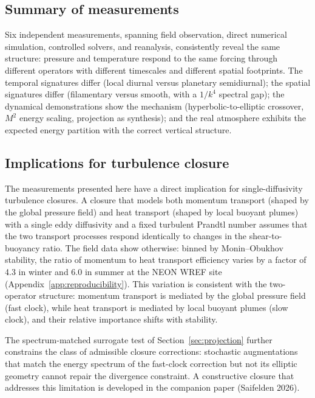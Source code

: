 \documentclass[11pt]{article}
\begin{document}
\subsection{Summary of measurements}

Six independent measurements, spanning field observation, direct numerical
simulation, controlled solvers, and reanalysis, consistently reveal the same
structure: pressure and temperature respond to the same forcing through different
operators with different timescales and different spatial footprints. The temporal
signatures differ (local diurnal versus planetary semidiurnal); the spatial
signatures differ (filamentary versus smooth, with a $1/k^4$ spectral gap); the
dynamical demonstrations show the mechanism (hyperbolic-to-elliptic crossover,
$M^2$ energy scaling, projection as synthesis); and the real atmosphere exhibits
the expected energy partition with the correct vertical structure.

\subsection{Implications for turbulence closure}

The measurements presented here have a direct implication for single-diffusivity
turbulence closures. A closure that models both momentum transport (shaped by the
global pressure field) and heat transport (shaped by local buoyant plumes) with a
single eddy diffusivity and a fixed turbulent Prandtl number assumes that the two
transport processes respond identically to changes in the shear-to-buoyancy ratio.
The field data show otherwise: binned by Monin--Obukhov stability, the ratio of
momentum to heat transport efficiency varies by a factor of 4.3 in winter and 6.0
in summer at the NEON WREF site (Appendix~\ref{app:reproducibility}). This
variation is consistent with the two-operator structure: momentum transport is
mediated by the global pressure field (fast clock), while heat transport is
mediated by local buoyant plumes (slow clock), and their relative importance
shifts with stability.

The spectrum-matched surrogate test of Section~\ref{sec:projection} further
constrains the class of admissible closure corrections: stochastic augmentations
that match the energy spectrum of the fast-clock correction but not its elliptic
geometry cannot repair the divergence constraint. A constructive closure that
addresses this limitation is developed in the companion paper (Saifelden 2026).
\end{document}
